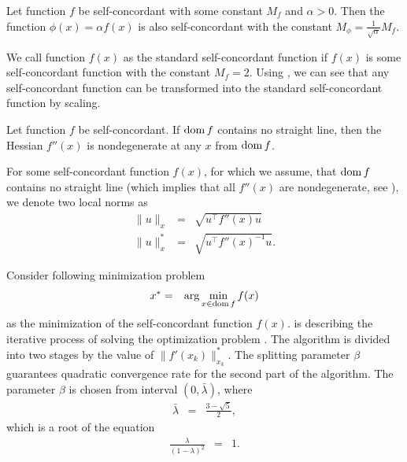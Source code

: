 \begin{corollary}
  Let function $f$ be self-concordant with some constant $M_f$ and $\alpha > 0$. Then the function $\phi(x) = \alpha f(x)$ is also self-concordant with the constant $M_\phi = \frac{1}{\sqrt{\alpha}}M_f$.
\end{corollary}

We call function $f(x)$ as the standard self-concordant function if $f(x)$ is some self-concordant function with the constant $M_f = 2$. Using , we can see that any self-concordant function can be transformed into the standard self-concordant function by scaling.

\begin{theorem}
  Let function $f$ be self-concordant. If $\operatorname{dom} f$ contains no straight line, then the Hessian $f''(x)$ is nondegenerate at any $x$ from $\operatorname{dom} f$.
\end{theorem}

For some self-concordant function $f(x)$, for which we assume, that $\operatorname{dom} f$ contains no straight line (which implies that all $f''(x)$ are nondegenerate, see ), we denote two local norms as
\begin{eqnarray}
  \| u \|_x &=& \sqrt{u^\top f''(x) u}\\
  \| u \|_x^* &=& \sqrt{u^\top f''(x)^{-1} u}.
\end{eqnarray}

Consider following minimization problem
\begin{eqnarray}
  x^* &=& \arg\min_{x\in\dom f} f(x)\labeleq{SDP:scf:minProblem}
\end{eqnarray}
as the minimization of the self-concordant function $f(x)$.
 is describing the iterative process of solving the optimization problem .
The algorithm is divided into two stages by the value of $\|f'(x_k)\|_{x_k}^*$.
The splitting parameter $\beta$ guarantees quadratic convergence rate for the second part of the algorithm. The parameter $\beta$ is chosen from interval $(0, \bar{\lambda})$, where
\begin{eqnarray}
  \bar{\lambda} &=& \frac{3 - \sqrt{5}}{2},
\end{eqnarray}
which is a root of the equation
\begin{eqnarray}
  \frac{\lambda}{(1-\lambda)^2} &=& 1.
\end{eqnarray}



